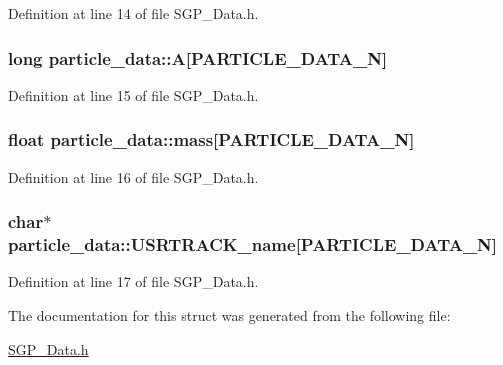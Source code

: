Definition at line 14 of file SGP\_\-Data.h.\hypertarget{structparticle__data_4531a4160109db46a68c19af96f61ec1}{
\subsubsection[A]{\setlength{\rightskip}{0pt plus 5cm}long {\bf particle\_\-data::A}\mbox{[}PARTICLE\_\-DATA\_\-N\mbox{]}}}
\label{d6/dac/structparticle__data_4531a4160109db46a68c19af96f61ec1}




Definition at line 15 of file SGP\_\-Data.h.\hypertarget{structparticle__data_e832458e2519a30d9ed3c7fc90eea252}{
\subsubsection[mass]{\setlength{\rightskip}{0pt plus 5cm}float {\bf particle\_\-data::mass}\mbox{[}PARTICLE\_\-DATA\_\-N\mbox{]}}}
\label{d6/dac/structparticle__data_e832458e2519a30d9ed3c7fc90eea252}




Definition at line 16 of file SGP\_\-Data.h.\hypertarget{structparticle__data_e0e12608aa6af83103a9fdd854eda3d4}{
\subsubsection[USRTRACK\_\-name]{\setlength{\rightskip}{0pt plus 5cm}char$\ast$ {\bf particle\_\-data::USRTRACK\_\-name}\mbox{[}PARTICLE\_\-DATA\_\-N\mbox{]}}}
\label{d6/dac/structparticle__data_e0e12608aa6af83103a9fdd854eda3d4}




Definition at line 17 of file SGP\_\-Data.h.

The documentation for this struct was generated from the following file:\begin{CompactItemize}
\item 
\hyperlink{SGP__Data_8h}{SGP\_\-Data.h}\end{CompactItemize}
